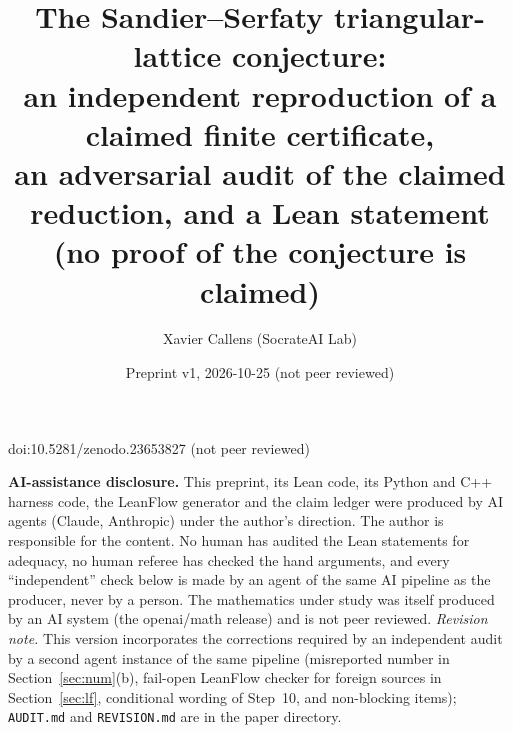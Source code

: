 \documentclass[10pt]{article}
\title{The Sandier--Serfaty triangular-lattice conjecture:\\
an independent reproduction of a claimed finite certificate,\\
an adversarial audit of the claimed reduction, and a Lean statement\\[2pt]
{\large (no proof of the conjecture is claimed)}}
\author{Xavier Callens (SocrateAI Lab)}
\date{Preprint v1, 2026-10-25 \quad (not peer reviewed)}
\begin{document}
\maketitle
\begin{center}\small doi:10.5281/zenodo.23653827 \quad (not peer reviewed)\end{center}


\noindent\textbf{AI-assistance disclosure.} This preprint, its Lean code, its Python and C++ harness code, the LeanFlow
generator and the claim ledger were produced by AI agents (Claude, Anthropic) under the author's direction. The author is
responsible for the content. No human has audited the Lean statements for adequacy, no human referee has checked the
hand arguments, and every ``independent'' check below is made by an agent of the same AI pipeline as the producer, never by
a person. The mathematics under study was itself produced by an AI system (the openai/math release) and is not peer
reviewed. \emph{Revision note.} This version incorporates the corrections required by an independent audit by a second agent
instance of the same pipeline (misreported number in Section~\ref{sec:num}(b), fail-open LeanFlow checker for foreign sources
in Section~\ref{sec:lf}, conditional wording of Step~10, and non-blocking items); \texttt{AUDIT.md} and \texttt{REVISION.md}
are in the paper directory.
\end{document}
